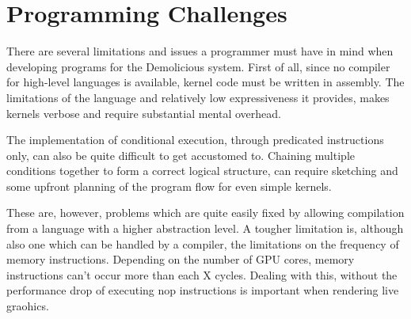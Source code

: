 \section{Programming Challenges}

There are several limitations and issues a programmer must have in mind when developing programs for the Demolicious system.
First of all, since no compiler for high-level languages is available, kernel code must be written in assembly.
The limitations of the language and relatively low expressiveness it provides,
makes kernels verbose and require substantial mental overhead.

The implementation of conditional execution, through predicated instructions only,
can also be quite difficult to get accustomed to.
Chaining multiple conditions together to form a correct logical structure,
can require sketching and some upfront planning of the program flow for even simple kernels.

These are, however, problems which are quite easily fixed by allowing compilation from a language with a higher abstraction level.
A tougher limitation is, although also one which can be handled by a compiler,
the limitations on the frequency of memory instructions.
Depending on the number of GPU cores,
memory instructions can't occur more than each X cycles.
Dealing with this, without the performance drop of executing nop instructions
is important when rendering live graohics.
